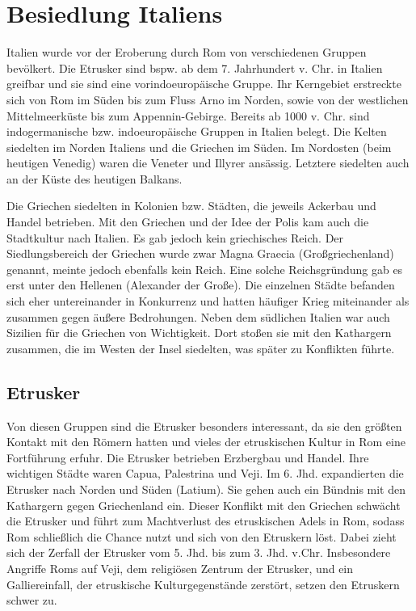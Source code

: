 \documentclass[10pt,a4paper,oneside,ngerman,numbers=noenddot]{scrartcl}
\begin{document}
\section*{Besiedlung Italiens}

Italien wurde vor der Eroberung durch Rom von verschiedenen Gruppen bevölkert. Die Etrusker sind bspw. ab dem 7. Jahrhundert v. Chr.
in Italien greifbar und sie sind eine vorindoeuropäische Gruppe. Ihr Kerngebiet erstreckte sich von Rom im Süden bis zum Fluss Arno im Norden,
sowie von der westlichen Mittelmeerküste bis zum Appennin-Gebirge. Bereits ab 1000 v. Chr. sind indogermanische bzw. indoeuropäische
Gruppen in Italien belegt.
Die Kelten siedelten im Norden Italiens und die Griechen im Süden. Im Nordosten (beim heutigen Venedig) waren die Veneter und Illyrer
ansässig. Letztere siedelten auch an der Küste des heutigen Balkans.

Die Griechen siedelten in Kolonien bzw. Städten, die jeweils Ackerbau und Handel betrieben. Mit den Griechen und der Idee der Polis
kam auch die Stadtkultur nach Italien. Es gab jedoch kein griechisches Reich. Der Siedlungsbereich der Griechen wurde zwar Magna Graecia
(Großgriechenland) genannt, meinte jedoch ebenfalls kein Reich. Eine solche Reichsgründung gab es erst unter den Hellenen (Alexander der
Große). Die einzelnen Städte befanden sich eher untereinander in Konkurrenz und hatten häufiger Krieg miteinander als zusammen gegen
äußere Bedrohungen. Neben dem südlichen Italien war auch Sizilien für die Griechen von Wichtigkeit. Dort stoßen sie mit den Kathargern
zusammen, die im Westen der Insel siedelten, was später zu Konflikten führte.

\subsection*{Etrusker}

Von diesen Gruppen sind die Etrusker besonders interessant, da sie den größten Kontakt mit den Römern hatten und vieles der etruskischen
Kultur in Rom eine Fortführung erfuhr. Die Etrusker betrieben Erzbergbau und Handel. Ihre wichtigen Städte waren Capua, Palestrina und Veji.
Im 6. Jhd. expandierten die Etrusker nach Norden und Süden (Latium). Sie gehen auch ein Bündnis mit den Kathargern gegen Griechenland ein.
Dieser Konflikt mit den Griechen schwächt die Etrusker und führt zum Machtverlust des etruskischen Adels in Rom, sodass Rom schließlich 
die Chance nutzt und sich von den Etruskern löst. Dabei zieht sich der Zerfall der Etrusker vom 5. Jhd. bis zum 3. Jhd. v.Chr. 
Insbesondere Angriffe Roms auf Veji, dem religiösen Zentrum der Etrusker, und ein Galliereinfall, der etruskische Kulturgegenstände zerstört, 
setzen den Etruskern schwer zu.
\end{document}
